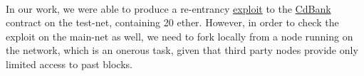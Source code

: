 \\
In our work, we were able to produce a re-entrancy \href{https://ropsten.etherscan.io/address/0x79a03b08668477464d488256c5b48552df1f2968#code}{exploit} to the \href{https://etherscan.io/address/0x09746c14f8c98f225491bb5f93bcea3b6db636fc}{CdBank} contract on the test-net, containing 20 ether. However, in order to check the exploit on the main-net as well, we need to fork locally from a node running on the network, which is an onerous task, given that third party nodes provide only limited access to past blocks.
            

